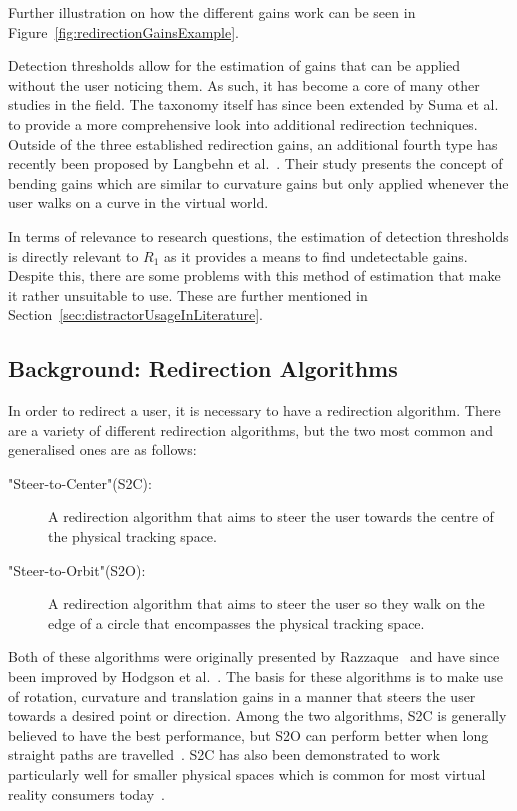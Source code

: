 Further illustration on how the different gains work can be seen in Figure~\ref{fig:redirectionGainsExample}.

Detection thresholds allow for the estimation of gains that can be applied without the user noticing them. As such, it has become a core of many other studies in the field. The taxonomy itself has since been extended by Suma et al.~\cite{suma2012taxonomy} to provide a more comprehensive look into additional redirection techniques. Outside of the three established redirection gains, an additional fourth type has recently been proposed by Langbehn et al.~\cite{7833190}. Their study presents the concept of bending gains which are similar to curvature gains but only applied whenever the user walks on a curve in the virtual world. 

In terms of relevance to research questions, the estimation of detection thresholds is directly relevant to $R_1$ as it provides a means to find undetectable gains. Despite this, there are some problems with this method of estimation that make it rather unsuitable to use. These are further mentioned in Section~\ref{sec:distractorUsageInLiterature}.

\subsection{Background: Redirection Algorithms}
In order to redirect a user, it is necessary to have a redirection algorithm. There are a variety of different redirection algorithms, but the two most common and generalised ones are as follows:
\begin{description}
    \item["Steer-to-Center"(S2C): ] A redirection algorithm that aims to steer the user towards the centre of the physical tracking space.
    \item["Steer-to-Orbit"(S2O): ] A redirection algorithm that aims to steer the user so they walk on the edge of a circle that encompasses the physical tracking space.
\end{description}
Both of these algorithms were originally presented by Razzaque~\cite{razzaque2005redirected} and have since been improved by Hodgson et al.~\cite{hodgson2013comparing}. The basis for these algorithms is to make use of rotation, curvature and translation gains in a manner that steers the user towards a desired point or direction. Among the two algorithms, S2C is generally believed to have the best performance, but S2O can perform better when long straight paths are travelled~\cite{hodgson2013comparing}. S2C has also been demonstrated to work particularly well for smaller physical spaces which is common for most virtual reality consumers today~\cite{azmandian2015physical}. 

